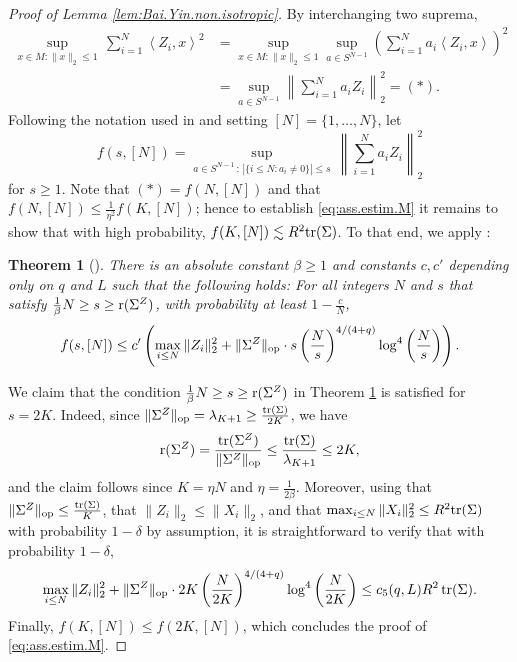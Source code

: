 \documentclass[11pt]{amsart}
\newcommand{\inr}[1]{\left\langle #1 \right\rangle}
\newtheorem{theorem}{Theorem}[section]
\theoremstyle{definition}
\numberwithin{equation}{section}
\begin{document}
\begin{proof}[Proof of Lemma \ref{lem:Bai.Yin.non.isotropic}]
By interchanging  two suprema,
\begin{align*} 
\sup_{x\in M : \|x\|_{2}\leq 1}\, \sum_{i=1}^N \inr{Z_i,x}^2
&=  \sup_{x\in M : \|x\|_{2}\leq 1} \sup_{a\in S^{N-1}}  \left( \sum_{i=1}^N a_i\inr{Z_i,x} \right)^2 \\
&= \sup_{a\in S^{N-1}}  \left\| \sum_{i=1}^N a_i Z_i \right\|_2^2
= (\ast).
\end{align*}
Following the notation used in \cite{abdalla2022covariance} and setting  $[N]=\{1,\dots,N\}$, let 
\[ f(s, [N]) 
=\sup_{a\in S^{N-1} \, : \, |\{ i \leq N : a_i \neq 0\}| \leq s} \,  \left\| \sum_{i=1}^N a_i Z_i \right\|_2^2\]
for $s\geq 1$.
Note that $(\ast)= f(N,[N])$ and that $f(N,[N])\leq \frac{1}{\eta^2} f(K,[N])$; hence to establish \eqref{eq:ass.estim.M} it remains to show that with high probability, $f(K,[N])\lesssim R^2 {\rm tr}(\Sigma)$.
To that end, we apply  \cite[Theorem 3]{abdalla2022covariance}:

\begin{theorem}[{\cite[Theorem 3]{abdalla2022covariance}}]
\label{thm:AZ}
There is an absolute constant $\beta\geq 1$ and constants $c,c'$ depending only on $q$ and $L$ such that the following holds:
For all integers $N$ and $s$ that satisfy   $\frac{1}{\beta}N\geq s\geq {\rm r}(\Sigma^Z)$,  with probability at least $1-\frac{c}{N}$,
\begin{align*}
f(s,[N]) 
\leq c' \left( \max_{i\leq N} \|Z_i\|_2^2 + \|\Sigma^Z\|_{\rm op} \cdot s  \left(\frac{N}{s}\right)^{4/(4+q)} \log^4\left( \frac{N}{s}\right) \right).
\end{align*}
\end{theorem}

We claim that the condition  $\frac{1}{\beta}N\geq s\geq {\rm r}(\Sigma^Z)$ in Theorem \ref{thm:AZ} is satisfied for $s=2K$.
Indeed, since  $\|\Sigma^Z\|_{\rm op}=\lambda_{K+1} \geq \frac{ {\rm tr}(\Sigma) }{2K}$,  we have 
\[ {\rm r}(\Sigma^Z) 
= \frac{{\rm tr}(\Sigma^Z)}{ \|\Sigma^Z\|_{\rm op}}
\leq \frac{{\rm tr}(\Sigma)}{\lambda_{K+1}}
\leq 2K,\]
and the claim follows since  $K=\eta N$ and $\eta=  \frac{1}{2\beta}$.
Moreover, using that $\|\Sigma^Z\|_{\rm op}\leq \frac{ {\rm tr}(\Sigma) }{K}$, that $\|Z_{i}\|_{2}\leq \|X_{i}\|_{2}$, and that $\max_{i\leq N} \|X_i\|_2^2 \leq R^2{\rm tr}(\Sigma)$ with probability $1-\delta$ by assumption, it is straightforward to verify that with probability $1-\delta$,
\[\max_{i\leq N} \|Z_i\|_2^2 + \|\Sigma^Z\|_{\rm op} \cdot 2K  \left(\frac{N}{2K}\right)^{4/(4+q)} \log^4\left( \frac{N}{2K}\right) 
\leq  c_5(q,L) R^2 \mathop{\rm tr}(\Sigma).\]
Finally, $f(K,[N])\leq f(2K,[N])$, which concludes the proof of \eqref{eq:ass.estim.M}.
 

\end{proof}
\end{document}
